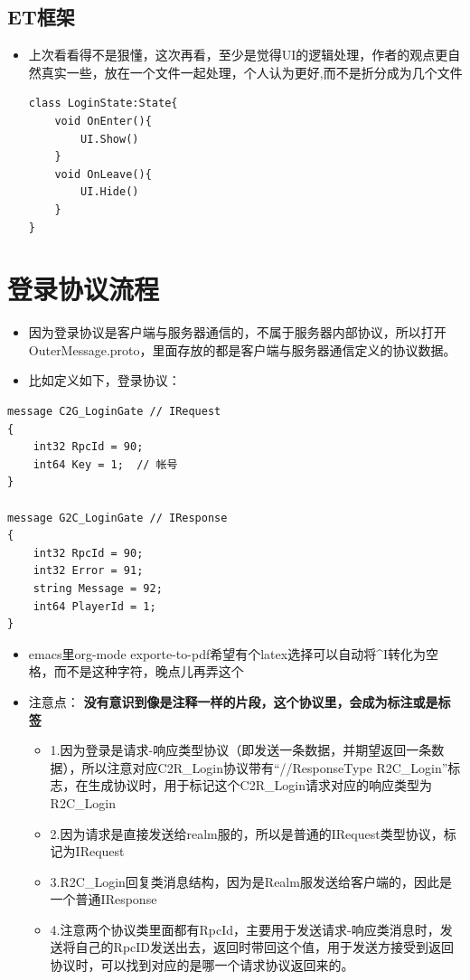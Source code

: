 \documentclass[9pt, b5paper]{article}
\begin{document}
\subsection{ET框架}
\label{sec-2-3}
\begin{itemize}
\item 上次看看得不是狠懂，这次再看，至少是觉得UI的逻辑处理，作者的观点更自然真实一些，放在一个文件一起处理，个人认为更好,而不是折分成为几个文件 
\begin{verbatim}
class LoginState:State{
	void OnEnter(){
		UI.Show()
	}
	void OnLeave(){
		UI.Hide()
	}
}
\end{verbatim}
\end{itemize}

\section{登录协议流程}
\label{sec-3}
\begin{itemize}
\item 因为登录协议是客户端与服务器通信的，不属于服务器内部协议，所以打开OuterMessage.proto，里面存放的都是客户端与服务器通信定义的协议数据。
\item 比如定义如下，登录协议：
\end{itemize}
\begin{verbatim}
message C2G_LoginGate // IRequest
{
	int32 RpcId = 90;
	int64 Key = 1;	// 帐号
}

message G2C_LoginGate // IResponse
{
	int32 RpcId = 90;
	int32 Error = 91;
	string Message = 92;
	int64 PlayerId = 1;
}
\end{verbatim}
\begin{itemize}
\item emacs里org-mode exporte-to-pdf希望有个latex选择可以自动将\^{}I转化为空格，而不是这种字符，晚点儿再弄这个
\item 注意点： \textbf{没有意识到像是注释一样的片段，这个协议里，会成为标注或是标签}
\begin{itemize}
\item 1.因为登录是请求-响应类型协议（即发送一条数据，并期望返回一条数据），所以注意对应C2R\_Login协议带有“//ResponseType R2C\_Login”标志，在生成协议时，用于标记这个C2R\_Login请求对应的响应类型为R2C\_Login
\item 2.因为请求是直接发送给realm服的，所以是普通的IRequest类型协议，标记为IRequest
\item 3.R2C\_Login回复类消息结构，因为是Realm服发送给客户端的，因此是一个普通IResponse
\item 4.注意两个协议类里面都有RpcId，主要用于发送请求-响应类消息时，发送将自己的RpcID发送出去，返回时带回这个值，用于发送方接受到返回协议时，可以找到对应的是哪一个请求协议返回来的。
\end{itemize}
\end{itemize}
\end{document}
